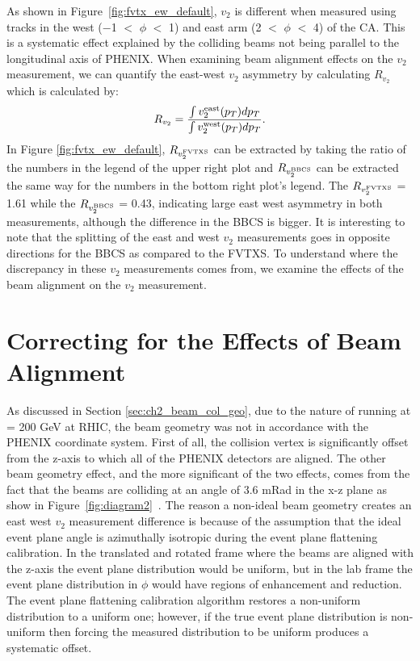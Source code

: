 As shown in Figure~\ref{fig:fvtx_ew_default}, $v_2$ is different when measured using tracks in the west ($-$1 $<$ $\phi$ $<$ 1) and east arm (2 $<$ $\phi$ $<$ 4) of the CA. This is a systematic effect explained by the colliding beams not being parallel to the longitudinal axis of PHENIX. When examining beam alignment effects on the $v_2$ measurement, we can quantify the east-west $v_2$ asymmetry by calculating $R_{v_2}$ which is calculated by: 
\begin{equation}
R_{v_2} = \frac{\int{v_2^{\rm east}(p_T)d\mbox{$p_T$}}}{\int{v_2^{\rm west}(p_T)d\mbox{$p_T$}}}.
\end{equation}
In Figure \ref{fig:fvtx_ew_default}, $R_{v_2^{\rm FVTXS}}$ can be extracted by taking the ratio of the numbers in the legend of the upper right plot and $R_{v_2^{\rm BBCS}}$ can be extracted the same way for the numbers in the bottom right plot's legend. The $R_{v_2^{\rm FVTXS}}$ = 1.61 while the $R_{v_2^{\rm BBCS}}$ = 0.43, indicating large east west asymmetry in both measurements, although the difference in the BBCS is bigger. It is interesting to note that the splitting of the east and west $v_2$ measurements goes in opposite directions for the BBCS as compared to the FVTXS. To understand where the discrepancy in these $v_2$ measurements comes from, we examine the effects of the beam alignment on the $v_2$ measurement.
\section{Correcting for the Effects of Beam Alignment}
As discussed in Section \ref{sec:ch2_beam_col_geo}, due to the nature of running \pau at \sqsn = 200 GeV at RHIC, the beam geometry was not in accordance with the PHENIX coordinate system. First of all, the collision vertex is significantly offset from the z-axis to which all of the PHENIX detectors are aligned. The other beam geometry effect, and the more significant of the two effects, comes from the fact that the beams are colliding at an angle of 3.6 mRad in the x-z plane as show in Figure~\ref{fig:diagram2}~\cite{BNL_Run15_Operations}. The reason a non-ideal beam geometry creates an east west $v_2$ measurement difference is because of the assumption that the ideal event plane angle is azimuthally isotropic during the event plane flattening calibration. In the translated and rotated frame where the beams are aligned with the z-axis the event plane distribution would be uniform, but in the lab frame the event plane distribution in $\phi$ would have regions of enhancement and reduction. The event plane flattening calibration algorithm restores a non-uniform distribution to a uniform one; however, if the true event plane distribution is non-uniform then forcing the measured distribution to be uniform produces a systematic offset.

